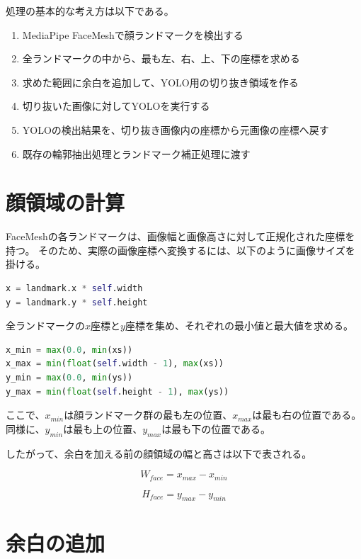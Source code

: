 \documentclass[uplatex,dvipdfmx]{jsarticle}
\begin{document}
処理の基本的な考え方は以下である。

\begin{enumerate}
  \item MediaPipe FaceMeshで顔ランドマークを検出する
  \item 全ランドマークの中から、最も左、右、上、下の座標を求める
  \item 求めた範囲に余白を追加して、YOLO用の切り抜き領域を作る
  \item 切り抜いた画像に対してYOLOを実行する
  \item YOLOの検出結果を、切り抜き画像内の座標から元画像の座標へ戻す
  \item 既存の輪郭抽出処理とランドマーク補正処理に渡す
\end{enumerate}

\section{顔領域の計算}

FaceMeshの各ランドマークは、画像幅と画像高さに対して正規化された座標を持つ。
そのため、実際の画像座標へ変換するには、以下のように画像サイズを掛ける。

\begin{lstlisting}[language=Python]
x = landmark.x * self.width
y = landmark.y * self.height
\end{lstlisting}

全ランドマークの$x$座標と$y$座標を集め、それぞれの最小値と最大値を求める。

\begin{lstlisting}[language=Python]
x_min = max(0.0, min(xs))
x_max = min(float(self.width - 1), max(xs))
y_min = max(0.0, min(ys))
y_max = min(float(self.height - 1), max(ys))
\end{lstlisting}

ここで、$x_{min}$は顔ランドマーク群の最も左の位置、$x_{max}$は最も右の位置である。
同様に、$y_{min}$は最も上の位置、$y_{max}$は最も下の位置である。

したがって、余白を加える前の顔領域の幅と高さは以下で表される。

\begin{equation}
  W_{face} = x_{max} - x_{min}
\end{equation}

\begin{equation}
  H_{face} = y_{max} - y_{min}
\end{equation}

\section{余白の追加}
\end{document}
